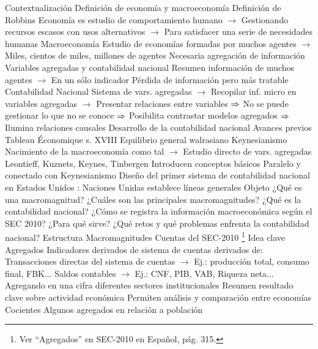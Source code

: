 \documentclass{nuevotema}
\begin{document}
\begin{esquemal}
	\1[] 
		\2 Contextualización
			\3 Definición de economía y macroeconomía
				\4 Definición de Robbins
				\4[] Economía es estudio de comportamiento humano
				\4[] $\to$ Gestionando recursos escasos con usos alternativos
				\4[] $\to$ Para satisfacer una serie de necesidades humanas
				\4 Macroeconomía
				\4[] Estudio de economías formadas por muchos agentes
				\4[] $\to$ Miles, cientos de miles, millones de agentes
				\4[] Necesaria agregación de información
			\3 Variables agregadas y contabilidad nacional
				\4 Resumen información de muchos agentes
				\4[] $\to$ En un sólo indicador
				\4 Pérdida de información pero más tratable
				\4 Contabilidad Nacional
				\4[] Sistema de vars. agregadas
				\4[] $\to$ Recopilar inf. micro en variables agregadas
				\4[] $\to$ Presentar relaciones entre variables
				\4[] $\Rightarrow$ No se puede gestionar lo que no se conoce
				\4[] $\Rightarrow$ Posibilita contrastar modelos agregados
				\4[] $\Rightarrow$ Ilumina relaciones causales
			\3 Desarrollo de la contabilidad nacional
				\4 Avances previos
				\4[] Tableau Économique s. XVIII
				\4[] Equilibrio general walrasiano
				\4 Keynesianismo
				\4[] Nacimiento de la macroeconomía como tal
				\4[] $\to$ Estudio directo de vars. agregadas
				\4 Leontieff, Kuznets, Keynes, Tinbergen
				\4[] Introducen conceptos básicos
				\4[] Paralelo y conectado con Keynesianismo
				\4 Diseño del primer sistema de contabilidad nacional
				 en Estados Unidos
				: Naciones Unidas establece líneas generales
		\2 Objeto
			\3 ¿Qué es una macromagnitud?
			\3 ¿Cuáles son las principales macromagnitudes?
			\3 ¿Qué es la contabilidad nacional?
			\3 ¿Cómo se registra la información macroeconómica según el SEC 2010?
			\3 ¿Para qué sirve?
			\3 ¿Qué retos y qué problemas enfrenta la contabilidad nacional?
		\2 Estructura
			\3 Macromagnitudes
			\3 Cuentas del SEC-2010
	\1 \footnote{Ver ``Agregados'' en SEC-2010 en Español, pág. 315.}
		\2 Idea clave
			\3 Agregados
				\4 Indicadores derivados de sistema de cuentas derivados de:
				\4[] Transacciones directas del sistema de cuentas
				\4[] $\to$ Ej.: producción total, consumo final, FBK...
				\4[] Saldos contables
				\4[] $\to$ Ej.: CNF, PIB, VAB, Riqueza neta...
				\4[$\to$] Agregando en una cifra diferentes sectores institucionales
				\4 Resumen resultado clave sobre actividad económica
				\4 Permiten análisis y comparación entre economías
			\3 Cocientes
				\4 Algunos agregados en relación a población

\end{esquemal}
\end{document}
